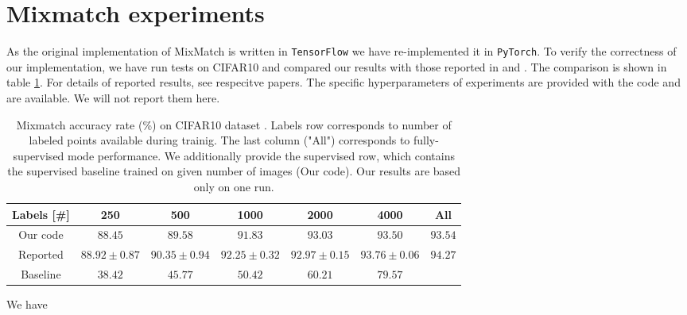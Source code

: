 \section{Mixmatch experiments}
As the original implementation of MixMatch is written in \texttt{TensorFlow} we have re-implemented it in \texttt{PyTorch}. To verify the correctness of our implementation, we have run tests on CIFAR10 and compared our results with those reported in \cite{mixmatch-2019} and \cite{wide-resnet-2017}. The 
comparison is shown in table \ref{tab:mixmatch-cifar10}. For details of reported results, see respecitve papers. 
The specific hyperparameters of experiments are provided with the code and are available. We will not report them here.
 
\begin{table}[htb]
    \begin{tabular}{|c|c|c|c|c|c|c|}
    \hline
    Labels [\#]  & 250 & 500 & 1000 & 2000 & 4000 & All \\
    \hline
    Our code & $88.45$ & $89.58$& $91.83$ & $93.03$ & $93.50$ & $93.54$\\
    \hline
    Reported & $88.92\pm0.87$ & $90.35\pm0.94$ & $92.25\pm0.32$ & $92.97\pm0.15$ & $93.76\pm 0.06$ & $94.27$\\
    \hline 
    Baseline & $38.42$ & $45.77$ & $50.42$ & $60.21$ & $79.57$ &  \\
    \hline
    \end{tabular}
    \caption[Mixmatch accuracy on CIFAR10]{Mixmatch accuracy rate (\%) on CIFAR10 dataset \cite{cifar10-2009}. Labels row corresponds to number of labeled points available during trainig. 
    The last column ("All") corresponds to fully-supervised mode performance.
    We additionally provide the supervised row, which contains the supervised baseline trained on given number of images (Our code).
    Our results are based only on one run.}
    \label{tab:mixmatch-cifar10}
\end{table}

We have 
     